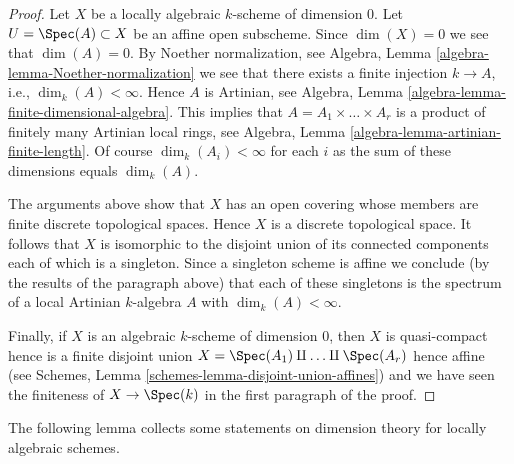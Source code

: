 \begin{proof}
Let $X$ be a locally algebraic $k$-scheme of dimension $0$.
Let $U = \Spec(A) \subset X$ be an affine open subscheme.
Since $\dim(X) = 0$ we see that $\dim(A) = 0$.
By Noether normalization, see
Algebra, Lemma \ref{algebra-lemma-Noether-normalization}
we see that there exists a finite injection $k \to A$, i.e.,
$\dim_k(A) < \infty$. Hence $A$ is Artinian, see
Algebra, Lemma \ref{algebra-lemma-finite-dimensional-algebra}.
This implies that $A = A_1 \times \ldots \times A_r$ is a product
of finitely many Artinian local rings, see
Algebra, Lemma \ref{algebra-lemma-artinian-finite-length}.
Of course $\dim_k(A_i) < \infty$ for each $i$ as the sum of
these dimensions equals $\dim_k(A)$.

\medskip\noindent
The arguments above show that $X$ has an open covering whose members are
finite discrete topological spaces. Hence $X$ is a discrete topological space.
It follows that $X$ is isomorphic to the disjoint union of its connected
components each of which is a singleton. Since a singleton scheme is affine
we conclude (by the results of the paragraph above) that each of these
singletons is the spectrum of a local Artinian $k$-algebra $A$ with
$\dim_k(A) < \infty$.

\medskip\noindent
Finally, if $X$ is an algebraic $k$-scheme of dimension $0$, then
$X$ is quasi-compact hence is a finite disjoint union
$X = \Spec(A_1) \amalg \ldots \amalg \Spec(A_r)$
hence affine (see
Schemes, Lemma \ref{schemes-lemma-disjoint-union-affines})
and we have seen the finiteness of $X \to \Spec(k)$ in the
first paragraph of the proof.
\end{proof}

\noindent
The following lemma collects some statements on dimension theory for locally
algebraic schemes.

